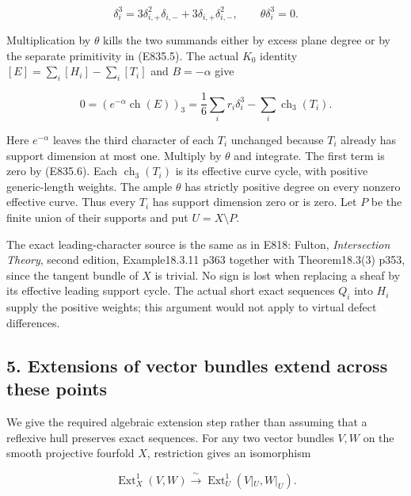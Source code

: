 \[
 \delta_i^3=3\delta_{i,+}^2\delta_{i,-}
                 +3\delta_{i,+}\delta_{i,-}^2,
 \qquad \theta\delta_i^3=0.
 \tag{E835.6}
\]

Multiplication by \(\theta\) kills the two summands either by excess plane
degree or by the separate primitivity in (E835.5). The actual \(K_0\) identity \([E]=\sum_i[H_i]-\sum_i[T_i]\) and \(B=-\alpha\) give

\[
 0=\left(e^{-\alpha}\operatorname{ch}(E)\right)_3
     =\frac16\sum_i r_i\delta_i^3-\sum_i\operatorname{ch}_3(T_i).
 \tag{E835.7}
\]

Here \(e^{-\alpha}\) leaves the third character of each \(T_i\) unchanged
because \(T_i\) already has support dimension at most one. Multiply by
\(\theta\) and integrate. The first term is zero by (E835.6). Each \(\operatorname{ch}_3(T_i)\)
is its effective curve cycle, with positive generic-length weights. The
ample \(\theta\) has strictly positive degree on every nonzero effective
curve. Thus every \(T_i\) has support dimension zero or is zero. Let \(P\) be
the finite union of their supports and put \(U=X\setminus P\).

The exact leading-character source is the same as in E818: Fulton,
\emph{Intersection Theory}, second edition, Example18.3.11 p363 together
with Theorem18.3(3) p353, since the tangent bundle of \(X\) is trivial. No
sign is lost when replacing a sheaf by its effective leading support
cycle. The actual short exact sequences \(Q_i\) into \(H_i\) supply the
positive weights; this argument would not apply to virtual defect
differences.

\subsection{5. Extensions of vector bundles extend across these
points}\label{SF-E835:extensions-of-vector-bundles-extend-across-these-points}

We give the required algebraic extension step rather than assuming that
a reflexive hull preserves exact sequences. For any two vector bundles
\(V,W\) on the smooth projective fourfold \(X\), restriction gives an
isomorphism

\[
 \operatorname{Ext}^1_X(V,W)
       \xrightarrow{\ \sim\ }
 \operatorname{Ext}^1_U(V|_U,W|_U).
 \tag{E835.8}
\]

